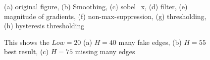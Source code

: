 \documentclass[final]{cvpr}
\begin{document}
\begin{appendices}
\begin{figure}[h]
{  }
  \quad
  \quad
  \caption{(a) original figure, (b) Smoothing, (c) sobel\_x, (d) filter, (e) magnitude of gradients, (f) non-max-suppression, (g) thresholding, (h) hysteresis thresholding}
  \label{fig:cannyall}
  \end{figure}
  
  

  \begin{figure}[htbp]
    \centering
    \quad
    \quad
    \caption{This shows the $Low=20$ (a) $H=40$ many fake edges, (b) $H=55$ best result, (c) $H=75$ missing many edges}
    \label{fig: Cannycompare}
    \end{figure}


\end{appendices}
\end{document}
